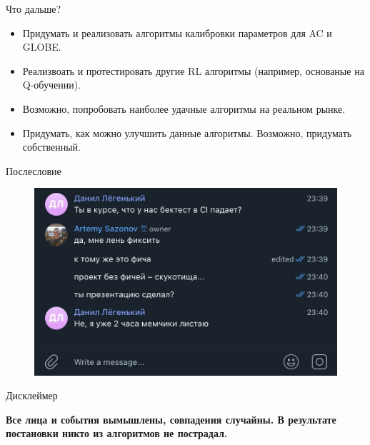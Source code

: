 \documentclass[aspectratio=169]{beamer}
\begin{document}
        \begin{frame}{Что дальше?}
            \begin{itemize}
                \item Придумать и реализовать алгоритмы калибровки параметров для AC и GLOBE.
                \item Реализвоать и протестировать другие RL алгоритмы (например, основаные на Q-обучении).
                \item Возможно, попробовать наиболее удачные алгоритмы на реальном рынке. 
                \item Придумать, как можно улучшить данные алгоритмы. Возможно, придумать собственный.
            \end{itemize}
        \end{frame}

        \begin{frame}{Послесловие}
            \begin{figure}  
                \centering
                \includegraphics[width=0.83\linewidth]{workflow.jpeg}
            \end{figure}
        \end{frame}

        \begin{frame}{Дисклеймер}
            \centering

            \bf\Large{Все лица и события вымышлены, совпадения случайны. В результате постановки никто из алгоритмов не пострадал.}
        \end{frame}
    
\end{document}
